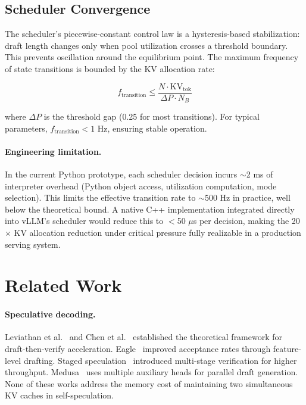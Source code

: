 \documentclass[review]{elsarticle}
\theoremstyle{definition}
\theoremstyle{remark}
\begin{document}
\subsection{Scheduler Convergence}

The scheduler's piecewise-constant control law is a hysteresis-based
stabilization: draft length changes only when pool utilization crosses
a threshold boundary. This prevents oscillation around the equilibrium
point. The maximum frequency of state transitions is bounded by the KV
allocation rate:

\[
f_\text{transition} \le \frac{N \cdot \text{KV}_\text{tok}}{\Delta P
    \cdot N_B}
\]

where $\Delta P$ is the threshold gap (0.25 for most transitions).
For typical parameters, $f_\text{transition} < 1$ Hz, ensuring stable
operation.

\paragraph{Engineering limitation.}
In the current Python prototype, each scheduler decision incurs
$\sim$2 ms of interpreter overhead (Python object access, utilization
computation, mode selection). This limits the effective transition rate
to $\sim$500 Hz in practice, well below the theoretical bound. A native
C++ implementation integrated directly into vLLM's scheduler would
reduce this to $<$50 $\mu$s per decision, making the 20$\times$ KV
allocation reduction under critical pressure fully realizable in a
production serving system.

\section{Related Work}

\paragraph{Speculative decoding.}
Leviathan et al.~\cite{leviathan2023} and Chen et al.~\cite{specdec2023}
established the theoretical framework for draft-then-verify acceleration.
Eagle~\cite{eagle2024} improved acceptance rates through feature-level
drafting. Staged speculation~\cite{staged-spec} introduced multi-stage
verification for higher throughput. Medusa~\cite{medusa2024} uses multiple
auxiliary heads for parallel draft generation. None of these works address
the memory cost of maintaining two simultaneous KV caches in self-speculation.
\end{document}
